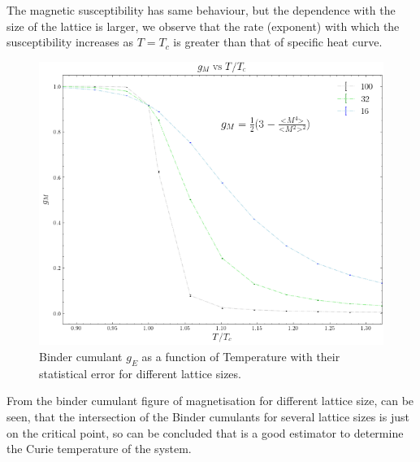 \documentclass[article]{revtex4}
\begin{document}
The magnetic susceptibility has same behaviour, but the dependence with the size of the lattice is larger, we observe that the rate (exponent) with which the susceptibility increases as
$T=T_c$  is greater than that of specific heat curve.
 \\
\begin{figure}[h!]
  \centering
  \includegraphics[width=0.5\linewidth]{binder_vs_T_L.png}
  \caption{Binder cumulant $g_E$ as a function of Temperature with their statistical error for different lattice sizes.}
\end{figure}
From the binder cumulant figure of magnetisation for different lattice size, can be seen, that the intersection of the Binder cumulants for several
lattice sizes is just on the critical point, so can be concluded that is a good estimator to determine the Curie temperature of the system.
\end{document}
